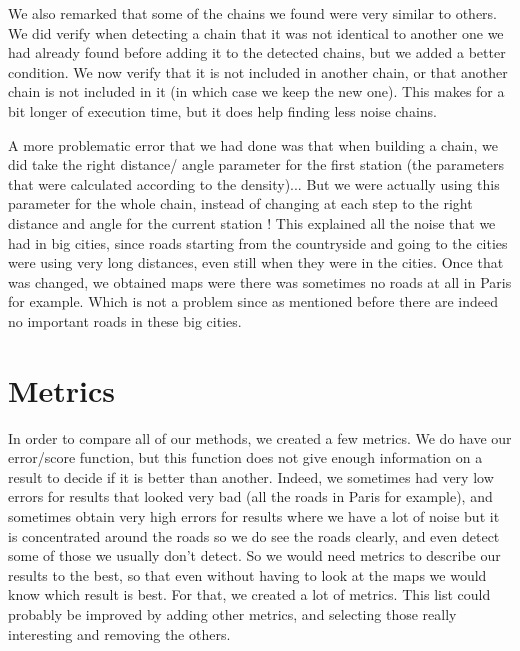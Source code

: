 \documentclass[main.tex]{subfiles}
\begin{document}
We also remarked that some of the chains we found were very similar to others. We did verify when detecting a chain that it was not identical to another one we had already found before adding it to the detected chains, but we added a better condition. We now verify that it is not included in another chain, or that another chain is not included in it (in which case we keep the new one). This makes for a bit longer of execution time, but it does help finding less noise chains.

A more problematic error that we had done was that when building a chain, we did take the right distance/ angle parameter for the first station (the parameters that were calculated according to the density)... But we were actually using this parameter for the whole chain, instead of changing at each step to the right distance and angle for the current station ! This explained all the noise that we had in big cities, since roads starting from the countryside and going to the cities were using very long distances, even still when they were in the cities. Once that was changed, we obtained maps were there was sometimes no roads at all in Paris for example. Which is not a problem since as mentioned before there are indeed no important roads in these big cities. 


\section{Metrics}

In order to compare all of our methods, we created a few metrics. We do have our error/score function, but this function does not give enough information on a result to decide if it is better than another. Indeed, we sometimes had very low errors for results that looked very bad (all the roads in Paris for example), and sometimes obtain very high errors for results where we have a lot of noise but it is concentrated around the roads so we do see the roads clearly, and even detect some of those we usually don't detect. So we would need metrics to describe our results to the best, so that even without having to look at the maps we would know which result is best. For that, we created a lot of metrics. This list could probably be improved by adding other metrics, and selecting those really interesting and removing the others.
\end{document}
